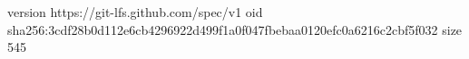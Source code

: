 version https://git-lfs.github.com/spec/v1
oid sha256:3cdf28b0d112e6cb4296922d499f1a0f047fbebaa0120efc0a6216c2cbf5f032
size 545
